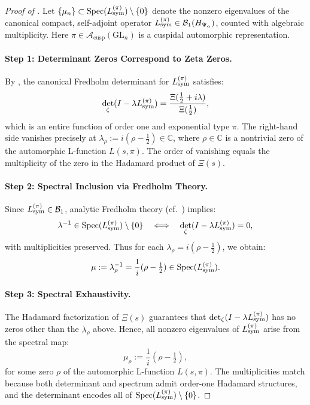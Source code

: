 \begin{proof}[Proof of ]
Let \( \{ \mu_n \} \subset \operatorname{Spec}(L_{\mathrm{sym}}^{(\pi)}) \setminus \{0\} \) denote the nonzero eigenvalues of the canonical compact, self-adjoint operator \( L_{\mathrm{sym}}^{(\pi)} \in \mathcal{B}_1(H_{\Psi_\alpha}) \), counted with algebraic multiplicity. Here \( \pi \in \mathcal{A}_{\text{cusp}}(\mathrm{GL}_n) \) is a cuspidal automorphic representation.

\paragraph{Step 1: Determinant Zeros Correspond to Zeta Zeros.}
By , the canonical Fredholm determinant for \( L_{\mathrm{sym}}^{(\pi)} \) satisfies:
\[
\det_\zeta(I - \lambda L_{\mathrm{sym}}^{(\pi)}) = \frac{\Xi(\tfrac{1}{2} + i\lambda)}{\Xi(\tfrac{1}{2})},
\]
which is an entire function of order one and exponential type \( \pi \). The right-hand side vanishes precisely at \( \lambda_\rho := i(\rho - \tfrac{1}{2}) \in \mathbb{C} \), where \( \rho \in \mathbb{C} \) is a nontrivial zero of the automorphic L-function \( L(s, \pi) \). The order of vanishing equals the multiplicity of the zero in the Hadamard product of \( \Xi(s) \).

\paragraph{Step 2: Spectral Inclusion via Fredholm Theory.}
Since \( L_{\mathrm{sym}}^{(\pi)} \in \mathcal{B}_1 \), analytic Fredholm theory (cf.~\cite[Thm.~3.1]{Simon2005TraceIdeals}) implies:
\[
\lambda^{-1} \in \operatorname{Spec}(L_{\mathrm{sym}}^{(\pi)}) \setminus \{0\} \quad \Longleftrightarrow \quad \det_\zeta(I - \lambda L_{\mathrm{sym}}^{(\pi)}) = 0,
\]
with multiplicities preserved. Thus for each \( \lambda_\rho = i(\rho - \tfrac{1}{2}) \), we obtain:
\[
\mu := \lambda_\rho^{-1} = \frac{1}{i}(\rho - \tfrac{1}{2}) \in \operatorname{Spec}(L_{\mathrm{sym}}^{(\pi)}).
\]

\paragraph{Step 3: Spectral Exhaustivity.}
The Hadamard factorization of \( \Xi(s) \) guarantees that \( \det_\zeta(I - \lambda L_{\mathrm{sym}}^{(\pi)}) \) has no zeros other than the \( \lambda_\rho \) above. Hence, all nonzero eigenvalues of \( L_{\mathrm{sym}}^{(\pi)} \) arise from the spectral map:
\[
\mu_\rho := \frac{1}{i}(\rho - \tfrac{1}{2}),
\]
for some zero \( \rho \) of the automorphic L-function \( L(s, \pi) \). The multiplicities match because both determinant and spectrum admit order-one Hadamard structures, and the determinant encodes all of \( \operatorname{Spec}(L_{\mathrm{sym}}^{(\pi)}) \setminus \{0\} \).


\end{proof}
